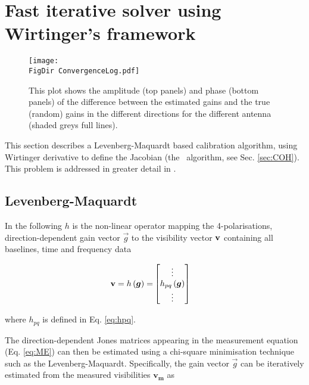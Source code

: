 \section{Fast iterative solver using Wirtinger's framework}
\label{sec:Solver}

\begin{figure*}[t!]
\begin{center}
\texttt{[image: \\FigDir ConvergenceLog.pdf]}
\caption{\label{fig:Convergence} This plot shows the amplitude (top
  panels) and
  phase (bottom panels) of the difference between
  the estimated gains and the true (random) gains in the different
  directions for the different antenna (shaded greys full lines).}
\end{center}
\end{figure*}

This section describes a Levenberg-Maquardt based calibration algorithm, using
Wirtinger derivative to define the Jacobian (the \COH~algorithm, see
Sec. \ref{sec:COH}). This problem is addressed in greater detail in \citet[][]{SmirnovTasse14}.

\subsection{Levenberg-Maquardt}

In the following $h$ is the non-linear operator mapping the
4-polarisations, direction-dependent gain vector $\vec{g}$ to the
visibility vector $\textbf{v}$ containing all baselines, time and frequency
data

\begin{alignat}{2}
\vis=h\left(\vec{g}\right)=&
\begin{bmatrix} 
\vdots \\ 
h_{pq}\left(\vec{g}\right)\\ 
\vdots \\ 
\end{bmatrix}
\end{alignat}


\noindent where $h_{pq}$ is defined in Eq. \ref{eq:hpq}.

The direction-dependent Jones matrices appearing in the measurement
equation (Eq. \ref{eq:ME}) can then be estimated using a chi-square
minimisation technique such as the Levenberg-Maquardt. Specifically, the gain vector $\vec{g}$ can be iteratively estimated from the
measured visibilities $\mathbf{v_m}$ as

